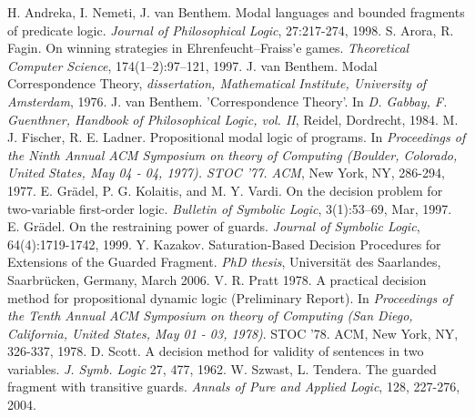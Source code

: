 \documentclass[a4paper]{article}
\begin{document}
\begin{thebibliography}{12}
	H. Andreka, I. Nemeti, J. van Benthem. Modal languages and bounded fragments of predicate logic. \emph{Journal of Philosophical Logic}, 27:217-274, 1998. 
	S. Arora, R. Fagin. On winning strategies in Ehrenfeucht--Fraiss'e games. \emph{Theoretical Computer Science}, 174(1--2):97--121, 1997. 
	J. van Benthem. Modal Correspondence Theory, \emph{dissertation, Mathematical Institute, University of Amsterdam}, 1976.
	J. van Benthem. 'Correspondence Theory'. In \emph{D. Gabbay, F. Guenthner, Handbook of Philosophical Logic, vol. II}, Reidel, Dordrecht, 1984.
	M. J. Fischer, R. E. Ladner. Propositional modal logic of programs. In \emph{Proceedings of the Ninth Annual ACM Symposium on theory of Computing (Boulder, Colorado, United States, May 04 - 04, 1977). STOC '77. ACM}, New York, NY, 286-294, 1977.
	E. Gr\"{a}del, P. G. Kolaitis, and M. Y. Vardi. On the decision problem for two-variable first-order logic. \emph{Bulletin of Symbolic Logic}, 3(1):53--69, Mar, 1997.
	E. Gr\"{a}del. On the restraining power of guards. \emph{Journal of Symbolic Logic}, 64(4):1719-1742, 1999.
	Y. Kazakov. Saturation-Based Decision Procedures for Extensions of the Guarded Fragment.
	\emph{PhD thesis}, Universit\"{a}t des Saarlandes, Saarbr\"{u}cken, Germany, March 2006.
	V. R. Pratt 1978. A practical decision method for propositional dynamic logic (Preliminary Report). In \emph{Proceedings of the Tenth Annual ACM Symposium on theory of Computing (San Diego, California, United States, May 01 - 03, 1978)}. STOC '78. ACM, New York, NY, 326-337, 1978.
	D. Scott. A decision method for validity of sentences in two variables. \emph{J. Symb. Logic} 27, 477, 1962.
	W. Szwast, L. Tendera. The guarded fragment with transitive guards. \emph{Annals of Pure and Applied Logic}, 128, 227-276, 2004.
\end{thebibliography}
\end{document}

